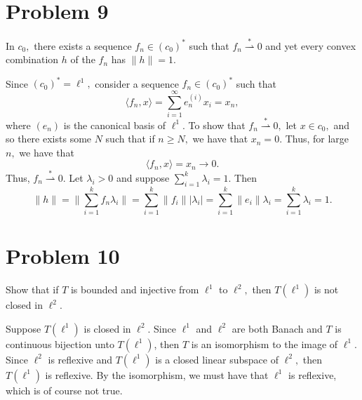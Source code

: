 \documentclass[11pt]{article}
\begin{document}
\section*{Problem 9}
\begin{problem}
    In $c_0,$ there exists a sequence $f_n \in (c_0)^*$ such that $f_n \stackrel{\ast}{\rightharpoonup} 0$ and yet every convex combination $h$ of the $f_n$ has $\|h\| = 1.$
\end{problem}
\begin{solution}
    Since $(c_0)^* = \ell^1,$ consider a sequence $f_n \in (c_0)^*$ such that
    \[\langle f_n, x \rangle = \sum_{i=1}^\infty e_n^{(i)} x_i = x_n,\] where $(e_n)$ is the canonical basis of $\ell^1.$ To show that $f_n  \stackrel{\ast}{\rightharpoonup} 0,$ let $x\in c_0,$ and so there exists some $N$ such that if $n\geq N,$ we have that $x_n = 0.$ Thus, for large $n,$ we have that 
    \[\langle f_n, x \rangle = x_n \to 0.\] Thus, $f_n \stackrel{\ast}{\rightharpoonup}  0.$ Let $\lambda_i >0$ and suppose $\sum_{i=1}^k \lambda_i = 1.$ Then
    \[\|h\| = \|\sum_{i=1}^k f_n \lambda_i\| = \sum_{i=1}^k \|f_i\||\lambda_i| = \sum_{i=1}^k \|e_i\|\lambda_i = \sum_{i=1}^k \lambda_i = 1.\]
\end{solution}
\newpage

\section*{Problem 10}
\begin{problem}
    Show that if $T$ is bounded and injective from $\ell^1$ to $\ell^2,$ then $T(\ell^1)$ is not closed in $\ell^2.$ 
\end{problem}
\begin{solution}
    Suppose $T(\ell^1)$ is closed in $\ell^2.$ Since $\ell^1$ and $\ell^2$ are both Banach and $T$ is continuous bijection unto $T(\ell^1)$, then $T$ is an isomorphism to the image of $\ell^1.$ Since $\ell^2$ is reflexive and $T(\ell^1)$ is a closed linear subspace of $\ell^2,$ then $T(\ell^1)$ is reflexive. By the isomorphism, we must have that $\ell^1$ is reflexive, which is of course not true.
\end{solution}




\newpage
\end{document}
